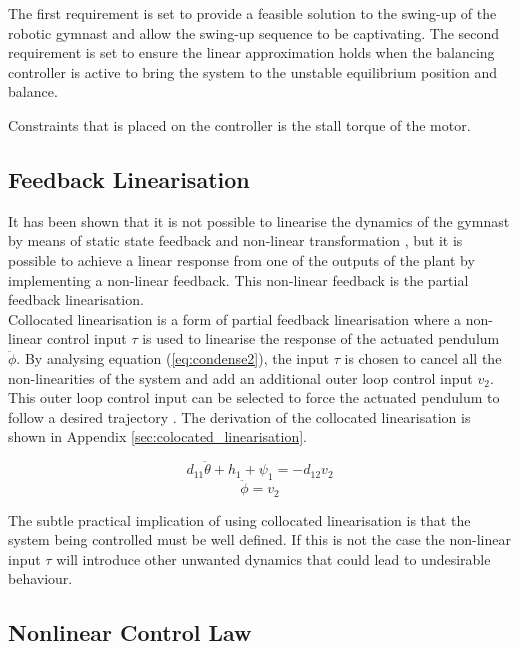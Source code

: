 The first requirement is set to provide a feasible solution to the swing-up of the robotic gymnast and allow the swing-up sequence to be captivating. The second requirement is set to ensure the linear approximation holds when the balancing controller is active to bring the system to the unstable equilibrium position and balance.

Constraints that is placed on the controller is the stall torque of the motor. 

\subsection{Feedback Linearisation}
It has been shown that it is not possible to linearise the dynamics of the gymnast by means of static state feedback and non-linear transformation \cite{murray}, but it is possible to achieve a linear response from one of the outputs of the plant by implementing a non-linear feedback. This non-linear feedback is the partial feedback linearisation.\\

Collocated linearisation is a form of partial feedback linearisation where a non-linear control input $\tau$ is used to linearise the response of the actuated pendulum $\ddot{\phi}$. By analysing equation (\ref{eq:condense2}), the input $\tau$ is chosen to cancel all the non-linearities of the system and add an additional outer loop control input $v_{2}$. This outer loop control input can be selected to force the actuated pendulum to follow a desired trajectory \citep{spong_swingup}. The derivation of the collocated linearisation is shown in Appendix \ref{sec:colocated_linearisation}.

\begin{equation} \label{eq:collocated_lin1}
d_{11}\ddot{\theta} + h_{1} + \psi_{1} = -d_{12}v_{2}
\end{equation}
\begin{equation} \label{eq:collocated_lin2}
\ddot{\phi} = v_{2}
\end{equation}

The subtle practical implication of using collocated linearisation is that the system being controlled must be well defined. If this is not the case the non-linear input $\tau$ will introduce other unwanted dynamics that could lead to undesirable behaviour.

\subsection{Nonlinear Control Law}

